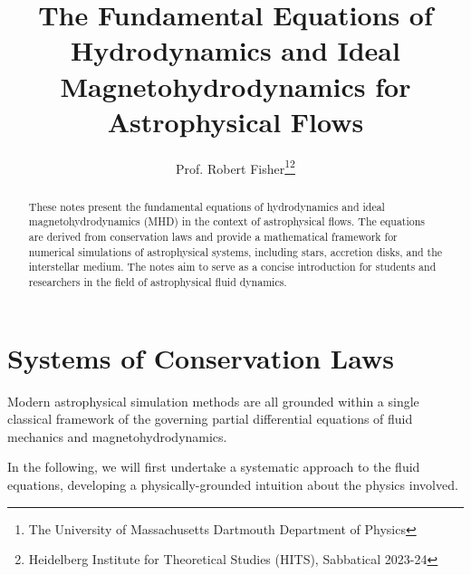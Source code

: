 \documentclass[notoc]{tufte-handout}
\title{The Fundamental Equations of Hydrodynamics and Ideal Magnetohydrodynamics for Astrophysical Flows}
\author[Prof. Robert Fisher]{Prof. Robert Fisher\thanks{The University of Massachusetts Dartmouth Department of Physics}\thanks{Heidelberg Institute for Theoretical Studies (HITS), Sabbatical 2023-24}}
\begin{document}
\maketitle

\begin{abstract}
These notes present the fundamental equations of hydrodynamics and ideal magnetohydrodynamics (MHD) in the context of astrophysical flows. The equations are derived from conservation laws and provide a mathematical framework for numerical simulations of astrophysical systems, including stars, accretion disks, and the interstellar medium. The notes aim to serve as a concise introduction for students and researchers in the field of astrophysical fluid dynamics.
\end{abstract}

\newpage


\section{Systems of Conservation Laws}

Modern astrophysical simulation methods are all grounded within a single classical framework of the governing partial differential equations of fluid mechanics and magnetohydrodynamics. 

In the following, we will first undertake a systematic approach to the fluid equations, developing a physically-grounded intuition about the physics involved. 
\end{document}
